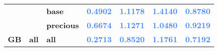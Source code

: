 \documentclass[
  authoryear,
  preprint,
  3p]{elsarticle}
\begin{document}
\begin{longtable}[t]{>{}l>{}l>{}l>{}r>{}r>{}r>{}r}
\textbf{} & \textbf{} & \textbf{base} & \textcolor[HTML]{4285f4}{\textbf{0.4902}} & \textcolor[HTML]{4285f4}{\textbf{1.1178}} & \textcolor[HTML]{4285f4}{\textbf{1.4140}} & \textcolor[HTML]{4285f4}{\textbf{0.8780}}\\
\addlinespace
\textbf{} & \textbf{} & \textbf{precious} & \textcolor[HTML]{4285f4}{\textbf{0.6674}} & \textcolor[HTML]{4285f4}{\textbf{1.1271}} & \textcolor[HTML]{4285f4}{\textbf{1.0480}} & \textcolor[HTML]{4285f4}{\textbf{0.9219}}\\
\textbf{GB} & \textbf{all} & \textbf{all} & \textcolor[HTML]{4285f4}{\textbf{0.2713}} & \textcolor[HTML]{4285f4}{\textbf{0.8520}} & \textcolor[HTML]{4285f4}{\textbf{1.1761}} & \textcolor[HTML]{4285f4}{\textbf{0.7192}}\\
\bottomrule

\end{longtable}

\endgroup{}

\newpage

\begingroup\fontsize{7}{9}\selectfont
\end{document}
